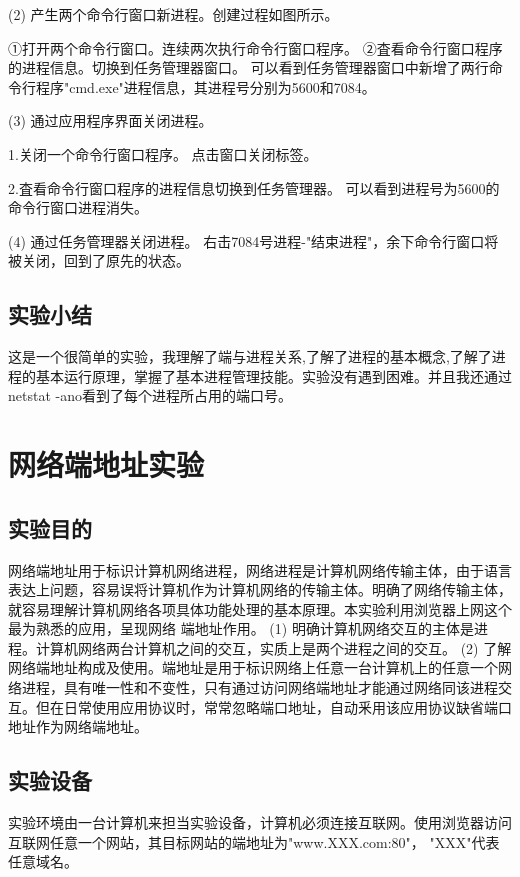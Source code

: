 \documentclass[lang=cn,11pt,a4paper,cite=authoryear]{elegantpaper}
\begin{document}
(2)	产生两个命令行窗口新进程。创建过程如图所示。

①打开两个命令行窗口。连续两次执行命令行窗口程序。
②査看命令行窗口程序的进程信息。切换到任务管理器窗口。
可以看到任务管理器窗口中新增了两行命令行程序"cmd.exe"进程信息，其进程号分别为5600和7084。

(3) 通过应用程序界面关闭进程。

1.关闭一个命令行窗口程序。
点击窗口关闭标签。

2.査看命令行窗口程序的进程信息切换到任务管理器。
可以看到进程号为5600的命令行窗口进程消失。

(4)	通过任务管理器关闭进程。
右击7084号进程-"结束进程"，余下命令行窗口将被关闭，回到了原先的状态。

\subsection{实验小结}
这是一个很简单的实验，我理解了端与进程关系,了解了进程的基本概念,了解了进程的基本运行原理，掌握了基本进程管理技能。实验没有遇到困难。并且我还通过netstat -ano看到了每个进程所占用的端口号。


\section{网络端地址实验}
\subsection{实验目的}
网络端地址用于标识计算机网络进程，网络进程是计算机网络传输主体，由于语言表达上问题，容易误将计算机作为计算机网络的传输主体。明确了网络传输主体，就容易理解计算机网络各项具体功能处理的基本原理。本实验利用浏览器上网这个最为熟悉的应用，呈现网络 端地址作用。
(1)	明确计算机网络交互的主体是进程。计算机网络两台计算机之间的交互，实质上是两个进程之间的交互。
(2)	了解网络端地址构成及使用。端地址是用于标识网络上任意一台计算机上的任意一个网络进程，具有唯一性和不变性，只有通过访问网络端地址才能通过网络同该进程交互。但在日常使用应用协议时，常常忽略端口地址，自动釆用该应用协议缺省端口地址作为网络端地址。 
\subsection{实验设备}
实验环境由一台计算机来担当实验设备，计算机必须连接互联网。使用浏览器访问互联网任意一个网站，其目标网站的端地址为"www.XXX.com:80"， "XXX"代表任意域名。
\end{document}
